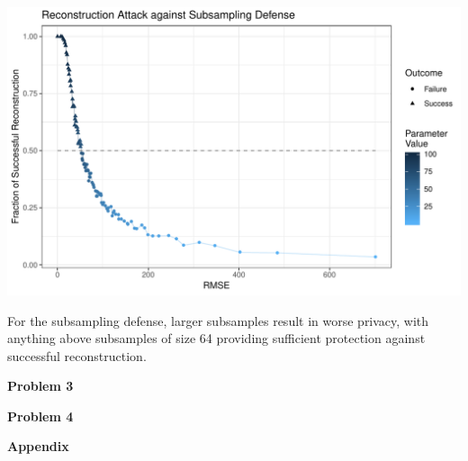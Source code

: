 \documentclass[12pt]{article}
\begin{document}
\begin{center}
\includegraphics[width=\textwidth]{figs/attacksubsampling}
\end{center}
For the subsampling defense, larger subsamples result in worse privacy, with anything above subsamples of size 64 providing sufficient protection against successful reconstruction.
\pagebreak

{\large\textbf{Problem 3}}

\pagebreak

{\large\textbf{Problem 4}}



{\large\textbf{Appendix}}
\end{document}
